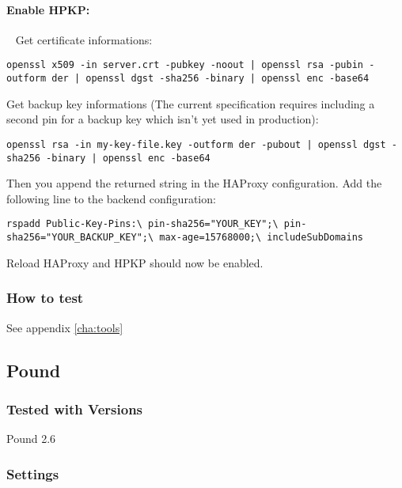 \paragraph*{Enable \ac{HPKP}:}
~
Get certificate informations:
\begin{lstlisting}
openssl x509 -in server.crt -pubkey -noout | openssl rsa -pubin -outform der | openssl dgst -sha256 -binary | openssl enc -base64
\end{lstlisting}
Get backup key informations (The current specification requires including a second pin for a backup key which isn't yet used in production):
\begin{lstlisting}
openssl rsa -in my-key-file.key -outform der -pubout | openssl dgst -sha256 -binary | openssl enc -base64
\end{lstlisting}
Then you append the returned string in the HAProxy configuration. Add the following line to the backend configuration:
\begin{lstlisting}
rspadd Public-Key-Pins:\ pin-sha256="YOUR_KEY";\ pin-sha256="YOUR_BACKUP_KEY";\ max-age=15768000;\ includeSubDomains
\end{lstlisting}
Reload HAProxy and HPKP should now be enabled.\\

\subsubsection{How to test}
See appendix \ref{cha:tools}

\subsection{Pound}

\subsubsection{Tested with Versions}
\begin{itemize*}
  \item Pound 2.6
\end{itemize*}

\subsubsection{Settings}


